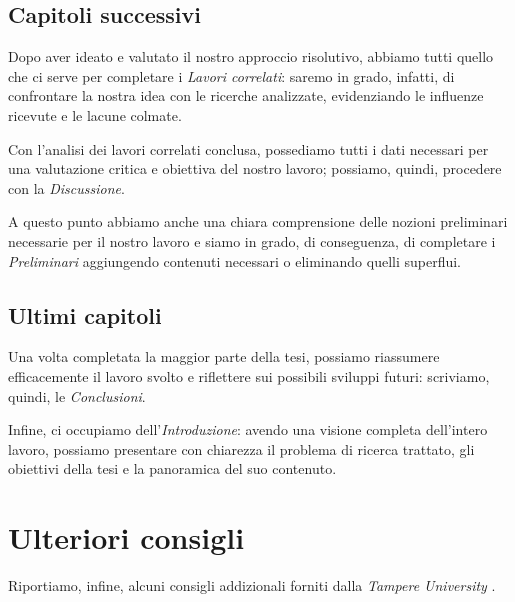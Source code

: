 \subsection{Capitoli successivi}

Dopo aver ideato e valutato il nostro approccio risolutivo, abbiamo tutti quello che ci serve per completare i \textit{Lavori correlati}: saremo in grado, infatti, di confrontare la nostra idea con le ricerche analizzate, evidenziando le influenze ricevute e le lacune colmate.

\medskip

Con l'analisi dei lavori correlati conclusa, possediamo tutti i dati necessari per una valutazione critica e obiettiva del nostro lavoro; possiamo, quindi, procedere con la \textit{Discussione}.

\medskip

A questo punto abbiamo anche una chiara comprensione delle nozioni preliminari necessarie per il nostro lavoro e siamo in grado, di conseguenza, di completare i \textit{Preliminari} aggiungendo contenuti necessari o eliminando quelli superflui.

\subsection{Ultimi capitoli}

Una volta completata la maggior parte della tesi, possiamo riassumere efficacemente il lavoro svolto e riflettere sui possibili sviluppi futuri: scriviamo, quindi, le \textit{Conclusioni}.

\medskip

Infine, ci occupiamo dell'\textit{Introduzione}: avendo una visione completa dell'intero lavoro, possiamo presentare con chiarezza il problema di ricerca trattato, gli obiettivi della tesi e la panoramica del suo contenuto.

\section{Ulteriori consigli}

Riportiamo, infine, alcuni consigli addizionali forniti dalla \textit{Tampere University} \cite{tuni2019guide}.

